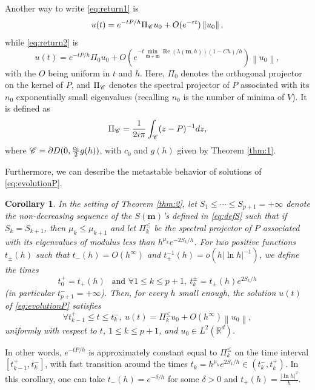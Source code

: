 \documentclass[12pt]{amsart}
\renewcommand{\Re}{\operatorname{Re}}
\newcommand{\R}{\mathbb R}
\numberwithin{equation}{section}
\numberwithin{figure}{section}
\def\m{\mathbf{m}}
\def\um{\underline{\m}}
\newcommand{\vvert}[1]{\left\lVert#1\right\rVert}
\newtheorem{corollary}[defin]{Corollary}
\begin{document}
Another way to write \eqref{eq:return1} is
\begin{equation*}
u(t) = e^{-tP/h}\Pi_\Cr u_0 + O(e^{-\varepsilon t})\vvert{u_0},
\end{equation*}
while \eqref{eq:return2} is
\begin{equation*}
u(t) = e^{-tP/h}\Pi_0 u_0 + O(e^{-t\underset{\m\neq\um}{\min}\Re(\lambda(\m,h))(1-Ch)/h})\vvert{u_0},
\end{equation*}
with the $O$ being uniform in $t$ and $h$. Here, $\Pi_0$ denotes the orthogonal projector on the kernel of $P$, and $\Pi_{\mathscr C}$ denotes the spectral projector of $P$ associated with its $n_0$ exponentially small eigenvalues (recalling $n_0$ is the number of minima of $V$). It is defined as
\begin{equation*}
\Pi_{\mathscr C} = \frac{1}{2i\pi}\int_{{\mathscr C}}(z-P)^{-1}dz,
\end{equation*}
where ${\mathscr C} = \partial D(0,\frac{c_0}2g(h))$, with $c_0$ and $g(h)$ given by Theorem \ref{thm:1}.

Furthermore, we can describe the metastable behavior of solutions of \eqref{eq:evolutionP}.

\begin{corollary}\label{cor:times}
    In the setting of Theorem \ref{thm:2}, let $S_1\leq\cdots\leq S_{p+1}=+\infty$ denote the non-decreasing sequence of the $S(\m)$'s defined in \eqref{eq:defS} such that if $S_k = S_{k+1}$, then $\mu_k \leq \mu_{k+1}$ and let $\Pi^\leq_k$ be the spectral projector of $P$ associated with its eigenvalues of modulus less than $h^{\mu_k}e^{-2S_k/h}$. For two positive functions $t_\pm(h)$ such that $t_-(h) = O(h^\infty)$ and $t_+^{-1}(h) = o(h|\ln h|^{-1})$, we define the times
    \begin{equation*}
    t_0^+ = t_+(h)\ \ \text{ and }\forall1\leq k\leq p+1,\ t^\pm_k = t_\pm(h)e^{2S_k/h}
    \end{equation*}
    (in particular $t^-_{p+1} = +\infty$). Then, for every $h$ small enough, the solution $u(t)$ of \eqref{eq:evolutionP} satisfies
    \begin{equation*}
    \forall t^+_{k-1}\leq t\leq t^-_k,\ u(t) = \Pi^\leq_ku_0 + O(h^\infty)\vvert{u_0},
    \end{equation*}
    uniformly with respect to $t$, $1\leq k\leq p+1$, and $u_0\in L^2(\R^d)$.
\end{corollary}

In other words, $e^{-tP/h}$ is approximately constant equal to $\Pi^\leq_k$ on the time interval $[t^+_{k-1},t^-_k]$, with fast transition around the times $t_k = h^{\mu_k}e^{2S_k/h}\in(t^-_k,t^+_k)$. In this corollary, one can take $t_-(h) = e^{-\delta/h}$ for some $\delta>0$ and $t_+(h) = \frac{|\ln h|^2}{h}$.
\end{document}
